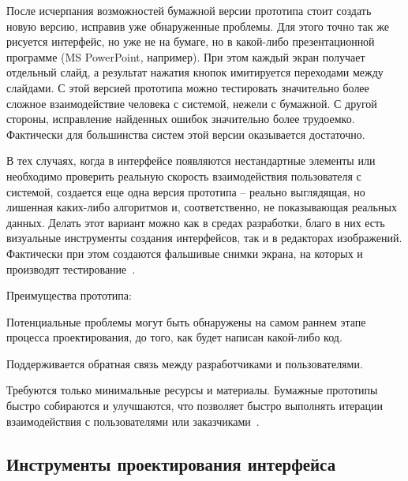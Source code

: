 \documentclass{../industrial-development}
\begin{document}
После исчерпания возможностей бумажной версии прототипа стоит создать новую версию, исправив уже обнаруженные проблемы. Для этого точно так же рисуется интерфейс, но уже не на бумаге, но в какой-либо презентационной программе (MS PowerPoint, например). При этом каждый экран получает отдельный слайд, а результат нажатия кнопок имитируется переходами между слайдами. С этой версией прототипа можно тестировать значительно более сложное взаимодействие человека с системой, нежели с бумажной. С другой стороны, исправление найденных ошибок значительно более трудоемко. Фактически для большинства систем этой версии оказывается достаточно.

В тех случаях, когда в интерфейсе появляются нестандартные элементы или необходимо проверить реальную скорость взаимодействия пользователя с системой, создается еще одна версия прототипа – реально выглядящая, но лишенная каких-либо алгоритмов и, соответственно, не показывающая реальных данных. Делать этот вариант можно как в средах разработки, благо в них есть визуальные инструменты создания интерфейсов, так и в редакторах изображений. Фактически при этом создаются фальшивые снимки экрана, на которых и производят тестирование~\cite[с.~128--130]{Golovach}.

Преимущества прототипа:

Потенциальные проблемы могут быть обнаружены на самом раннем этапе процесса проектирования, до того, как будет написан какой-либо код.

Поддерживается обратная связь между разработчиками и пользователями.
    
Требуются только минимальные ресурсы и материалы. Бумажные прототипы быстро собираются и улучшаются, что позволяет быстро выполнять итерации взаимодействия с пользователями или заказчиками~\cite{Usabilitynet-prototyping}.

\subsection{Инструменты проектирования интерфейса}
\end{document}
